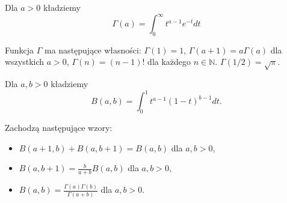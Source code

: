 \documentclass[12pt]{article}
\newcommand{\N}{\mathbb{N}}
\begin{document}
Dla $a > 0$ kładziemy
$$\Gamma(a) = \int_0^\infty t^{a-1} e^{-t} dt$$

\theorem{}
Funkcja $\Gamma$ ma następujące własności:
$\Gamma(1) = 1$, $\Gamma(a + 1) = a\Gamma(a)$ dla wszystkich $a > 0$, $\Gamma(n) = (n - 1)!$ dla każdego $n \in \N$. $\Gamma(1/2) = \sqrt{\pi}$.

Dla $a, b > 0$ kładziemy
$$B(a, b) = \int_0^1 t^{a-1} (1 - t)^{b-1} dt.$$

\theorem{}
Zachodzą następujące wzory:
\begin{itemize}
    \item $B(a + 1, b) + B(a, b + 1) = B(a, b)$ dla $a, b > 0$,
    \item $B(a, b + 1) = \frac{b}{a + b} B(a, b)$ dla $a, b > 0$,
    \item $B(a, b) = \frac{\Gamma(a)\Gamma(b)}{\Gamma(a + b)}$ dla $a, b > 0$.
\end{itemize}
\end{document}
